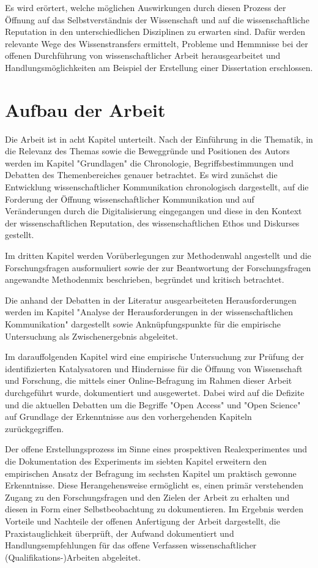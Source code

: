 Es wird erörtert, welche möglichen Auswirkungen durch diesen Prozess der Öffnung auf das Selbstverständnis der Wissenschaft und auf die wissenschaftliche Reputation in den unterschiedlichen Disziplinen zu erwarten sind. Dafür werden relevante Wege des Wissenstransfers ermittelt, Probleme und Hemmnisse bei der offenen Durchführung von wissenschaftlicher Arbeit herausgearbeitet und Handlungsmöglichkeiten am Beispiel der Erstellung einer Dissertation erschlossen.

\section{Aufbau der Arbeit}

Die Arbeit ist in acht Kapitel unterteilt. Nach der Einführung in die Thematik, in die Relevanz des Themas sowie die Beweggründe und Positionen des Autors werden im Kapitel "Grundlagen" die Chronologie, Begriffsbestimmungen und Debatten des Themenbereiches genauer betrachtet. Es wird zunächst die Entwicklung wissenschaftlicher Kommunikation chronologisch dargestellt, auf die Forderung der Öffnung wissenschaftlicher Kommunikation und auf Veränderungen durch die  Digitalisierung eingegangen und diese in den Kontext der wissenschaftlichen Reputation, des wissenschaftlichen Ethos und Diskurses gestellt.

Im dritten Kapitel werden Vorüberlegungen zur Methodenwahl angestellt und die Forschungsfragen ausformuliert sowie der zur Beantwortung der Forschungsfragen angewandte Methodenmix beschrieben, begründet und kritisch betrachtet.

Die anhand der Debatten in der Literatur ausgearbeiteten Herausforderungen werden im Kapitel "Analyse der Herausforderungen in der wissenschaftlichen Kommunikation" dargestellt sowie Anknüpfungspunkte für die empirische Untersuchung als Zwischenergebnis abgeleitet.

Im darauffolgenden Kapitel wird eine empirische Untersuchung zur Prüfung der identifizierten Katalysatoren und Hindernisse für die Öffnung von Wissenschaft und Forschung, die mittels einer Online-Befragung im Rahmen dieser Arbeit durchgeführt wurde, dokumentiert und ausgewertet. Dabei wird auf die Defizite und die aktuellen Debatten um die Begriffe "Open Access" und "Open Science" auf Grundlage der Erkenntnisse aus den vorhergehenden Kapiteln zurückgegriffen.

Der offene Erstellungsprozess im Sinne eines prospektiven Realexperimentes und die Dokumentation des Experiments im siebten Kapitel erweitern den empirischen Ansatz der Befragung im sechsten Kapitel um praktisch gewonne Erkenntnisse. Diese Herangehensweise ermöglicht es, einen primär verstehenden Zugang zu den Forschungsfragen und den Zielen der Arbeit zu erhalten und diesen in Form einer Selbstbeobachtung zu dokumentieren. Im Ergebnis werden Vorteile und Nachteile der offenen Anfertigung der Arbeit dargestellt, die Praxistauglichkeit überprüft, der Aufwand dokumentiert und Handlungsempfehlungen für das offene Verfassen wissenschaftlicher (Qualifikations-)Arbeiten abgeleitet.

